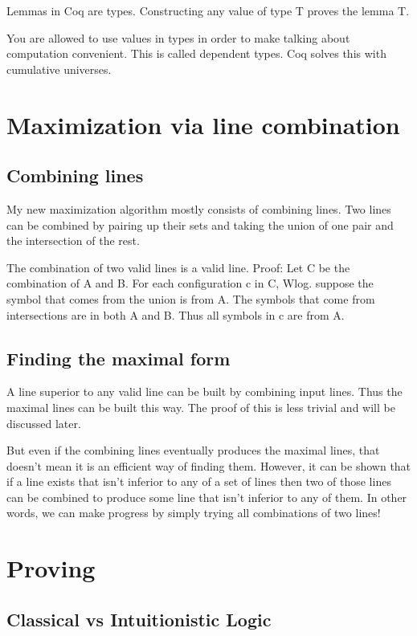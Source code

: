 \documentclass[english, 12pt, a4paper, sci, utf8, a-1b, online]{aaltothesis}
\begin{document}
Lemmas in Coq are types. Constructing any value of type T proves the lemma T.

You are allowed to use values in types in order to make talking about computation convenient. This is called dependent types. Coq solves this with cumulative universes.


\section{Maximization via line combination}

\subsection{Combining lines}

My new maximization algorithm mostly consists of combining lines. Two lines can be combined by pairing up their sets and taking the union of one pair and the intersection of the rest.

The combination of two valid lines is a valid line. Proof: Let C be the combination of A and B. For each configuration c in C, Wlog. suppose the symbol that comes from the union is from A. The symbols that come from intersections are in both A and B. Thus all symbols in c are from A.

\subsection{Finding the maximal form}

A line superior to any valid line can be built by combining input lines. Thus the maximal lines can be built this way. The proof of this is less trivial and will be discussed later.

But even if the combining lines eventually produces the maximal lines, that doesn't mean it is an efficient way of finding them. However, it can be shown that if a line exists that isn't inferior to any of a set of lines then two of those lines can be combined to produce some line that isn't inferior to any of them. In other words, we can make progress by simply trying all combinations of two lines!

\section{Proving}

\subsection{Classical vs Intuitionistic Logic}
\end{document}
